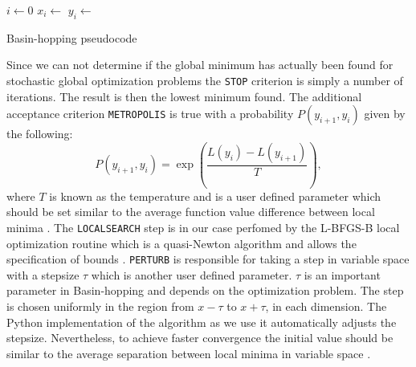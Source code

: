 \begin{algorithm}[H]
    \SetAlgoLined
     
    
    $i \leftarrow 0$\;
    $x_i \leftarrow $ \RP\;
    $y_i \leftarrow $ \;


\caption{Basin-hopping pseudocode}\label{algo_bh}
\end{algorithm}

Since we can not determine if the global minimum has actually been found for stochastic global optimization problems the \texttt{STOP} criterion is simply a number of iterations. The result is then the lowest minimum found. The additional acceptance criterion \texttt{METROPOLIS} is true with a probability $P(y_{i+1}, y_i)$ given by the following:
\begin{equation}
    P(y_{i+1}, y_i) = \exp\left(\frac{L(y_{i})-L(y_{i+1})}{T} \right),
\end{equation}
where $T$ is known as the temperature and is a user defined parameter which should be set similar to the average function value difference between local minima \cite{ScipyBH}. The \texttt{LOCALSEARCH} step is in our case perfomed by the L-BFGS-B local optimization routine which is a quasi-Newton algorithm and allows the specification of bounds \cite{Byrd1995}. \texttt{PERTURB} is responsible for taking a step in variable space with a stepsize $\tau$ which is another user defined parameter. $\tau$ is an important parameter in Basin-hopping and depends on the optimization problem. The step is chosen uniformly in the region from $x-\tau$ to $x+\tau$, in each dimension. The Python implementation of the algorithm as we use it automatically adjusts the stepsize. Nevertheless, to achieve faster convergence the initial value should be similar to the average separation between local minima in variable space \cite{ScipyBH}. 

